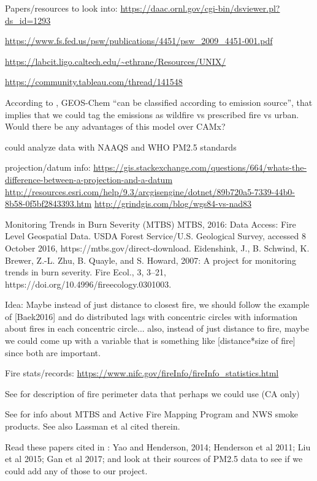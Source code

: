 Papers/resources to look into: \url{https://daac.ornl.gov/cgi-bin/dsviewer.pl?ds_id=1293}

\url{https://www.fs.fed.us/psw/publications/4451/psw_2009_4451-001.pdf}

\url{https://labcit.ligo.caltech.edu/~ethrane/Resources/UNIX/}

\url{https://community.tableau.com/thread/141548}

According to \cite{liu_particulate_2016}, GEOS-Chem ``can be classified according to emission source'', that implies that we could tag the emissions as wildfire vs prescribed fire vs urban. Would there be any advantages of this model over CAMx?

could analyze data with NAAQS and WHO PM2.5 standards

projection/datum info: \url{https://gis.stackexchange.com/questions/664/whats-the-difference-between-a-projection-and-a-datum}
\url{http://resources.esri.com/help/9.3/arcgisengine/dotnet/89b720a5-7339-44b0-8b58-0f5bf2843393.htm}
\url{http://grindgis.com/blog/wgs84-vs-nad83}

Monitoring Trends in Burn Severity (MTBS) MTBS, 2016: Data Access: Fire Level Geospatial Data. USDA Forest Service/U.S. Geological Survey, accessed 8 October 2016, https://mtbs.gov/direct-download. 
Eidenshink, J., B. Schwind, K. Brewer, Z.-L. Zhu, B. Quayle, and S. Howard, 2007: A project for monitoring trends in burn severity. Fire Ecol., 3, 3–21, https://doi.org/10.4996/fireecology.0301003. 

Idea: Maybe instead of just distance to closest fire, we should follow the example of [Baek2016] and do distributed lags with concentric circles with information about fires in each concentric circle... also, instead of just distance to fire, maybe we could come up with a variable that is something like [distance*size of fire] since both are important.

Fire stats/records: \url{https://www.nifc.gov/fireInfo/fireInfo_statistics.html}

See \cite{adelaine_assessment_2017} for description of fire perimeter data that perhaps we could use (CA only)

See \cite{vaidyanathan_developing_2018} for info about MTBS and Active Fire Mapping Program and NWS smoke products. See also Lassman et al \cite{lassman_spatial_2017} cited therein.

Read these papers cited in \cite{lassman_spatial_2017}: Yao and Henderson, 2014; Henderson et al 2011; Liu et al 2015; Gan et al 2017; and look at their sources of PM2.5 data to see if we could add any of those to our project.

